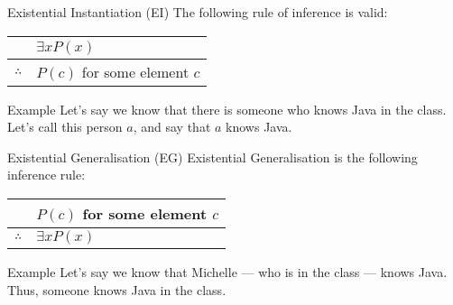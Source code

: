 \documentclass{article}
\begin{document}
\begin{parag}{Existential Instantiation (EI)}
    The following rule of inference is valid:
    \begin{center}
    \begin{tabular}{rl}
        & $\exists x P\left(x\right)$ \\
        \hline
        $\therefore$ & $P\left(c\right)$ for some element $c$
    \end{tabular}
    \end{center}

    \begin{subparag}{Example}
        Let's say we know that there is someone who knows Java in the class. Let's call this person $a$, and say that $a$ knows Java.
    \end{subparag}
\end{parag}

\begin{parag}{Existential Generalisation (EG)}
    Existential Generalisation is the following inference rule:
    \begin{center}
    \begin{tabular}{rl}
        & $P\left(c\right)$ for some element $c$ \\
        \hline
        $\therefore$ & $\exists x P\left(x\right)$
    \end{tabular}
    \end{center}

    \begin{subparag}{Example}
        Let's say we know that Michelle --- who is in the class --- knows Java. Thus, someone knows Java in the class.
    \end{subparag}
\end{parag}
\end{document}
